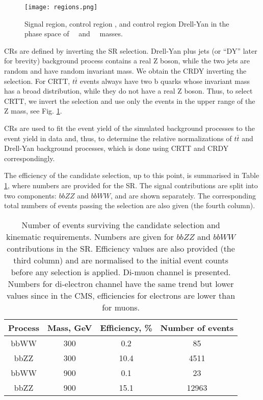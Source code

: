 \begin{small}
\begin{figure}[!htb]%
  \begin{center}
    \texttt{[image: regions.png]}
    \caption[Analysis phase space with the signal and two control regions.]{ Signal region, control region \ttbar, and control region Drell-Yan in the phase space of \ZtoLL \ ~and ~\HBB ~masses.    }
    \label{fig:regions}
  \end{center}
\end{figure}

CRs are defined by inverting the SR selection. Drell-Yan plus jets (or ``DY'' later for brevity) background process contains a real Z boson, while the two jets are random and have random invariant mass. We obtain the CRDY inverting the \HBB selection. For CRTT, $t\bar{t}$ events always have two b quarks whose invariant mass has a broad distribution, while they do not have a real Z boson. Thus, to select CRTT, we invert the \Zll selection and use only the events in the upper range of the Z mass, see Fig. \ref{fig:regions}. 

CRs are used to fit the event yield of the simulated background processes to the event yield in data and, thus, to determine the relative normalizations of $t\bar{t}$ and Drell-Yan background processes, which is done using CRTT and CRDY correspondingly. 

The efficiency of the candidate selection, up to this point, is summarised in Table \ref{eff_upto_bdt}, where numbers are provided for the SR. The signal contributions are split into two components: $bbZZ$ and $bbWW$, and are shown separately. The corresponding total numbers of events passing the selection are also given (the fourth column).

\begin{table}
\begin{center}
\caption{Number of events surviving the candidate selection and kinematic requirements. Numbers are given for $bbZZ$ and $bbWW$ contributions in the SR. Efficiency values are also provided (the third column) and are normalised to the initial event counts before any selection is applied. Di-muon channel is presented. Numbers for di-electron channel have the same trend but lower values since in the CMS, efficiencies for electrons are lower than for muons. }
\begin{tabular}{ |c|c|c|c| } \hline
{Process} & Mass, GeV & Efficiency, \% & Number of events \\\hline
bbWW & 300 &  0.2 & 85\\
bbZZ & 300 &  10.4 & 4511\\
bbWW & 900 &  0.1 & 23\\
bbZZ & 900 &  15.1 & 12963\\\hline
\end{tabular}
 \label{eff_upto_bdt}
\end{center}
\end{table}


\end{small}
